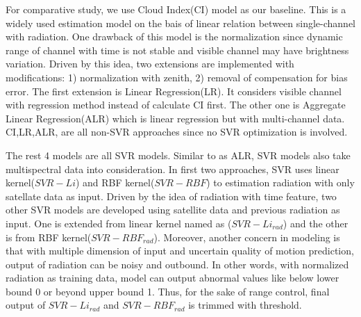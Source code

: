 \documentclass[conference]{IEEEtran}
\begin{document}
For comparative study, we use Cloud Index(CI) model as our baseline. This is a
widely used estimation model on the bais of linear relation between
single-channel with radiation. One drawback of this model is the normalization
since dynamic range of channel with time is not stable and visible channel may
have brightness variation. Driven by this idea, two extensions are implemented
with modifications: 1) normalization with zenith, 2) removal of
compensation for bias error. The first extension is Linear Regression(LR). It
considers visible channel with regression method instead of calculate CI first.
The other one is Aggregate Linear Regression(ALR) which is linear regression but
with multi-channel data. CI,LR,ALR, are all non-SVR approaches since no
SVR optimization is involved.

The rest 4 models are all SVR models. Similar to as ALR, SVR models also take
multispectral data into consideration. In first two approaches, SVR uses linear
kernel($SVR-Li$) and RBF kernel($SVR-RBF$) to estimation radiation with only
satellate data as input. Driven by the idea of radiation with time feature, two
other SVR models are developed using satellite data and previous radiation as
input. One is extended from linear kernel named as ($SVR-Li_{rad}$) and the
other is from RBF kernel($SVR-RBF_{rad}$). Moreover, another concern in modeling
is that with multiple dimension of input and uncertain quality of motion prediction, output of radiation can be noisy and
outbound. In other words, with normalized radiation as training data, model can
output abnormal values like below lower bound 0 or beyond upper bound 1. Thus,
for the sake of range control, final output of $SVR-Li_{rad}$ and
$SVR-RBF_{rad}$ is trimmed with threshold.
\end{document}
